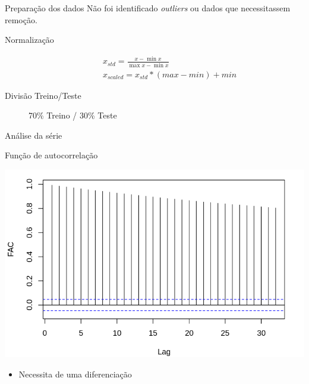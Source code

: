 \documentclass[compress,aspectratio=149,brazil]{beamer}
\begin{document}
\begin{frame}{Preparação dos dados}
    Não foi identificado \textit{outliers} ou dados que necessitassem remoção.

    \begin{description}
        \item[Normalização]
            \[
                \begin{split}\label{eq:minmaxscaler}
                    &x_{std} = \frac{x - \min x}{\max x-\min x}\\
                    &x_{scaled} = x_{std} * (max-min)+min
                \end{split}
            \]
        \item[Divisão Treino/Teste]
            70\% Treino / 30\% Teste
    \end{description}

\end{frame}

\begin{frame}{Análise da série}
    \begin{block}{Função de autocorrelação}
        \begin{center}
            \includegraphics[width=.8\textwidth]{../images/SP500_FAC.png}
        \end{center}
    \end{block}
    \begin{itemize}
        \item Necessita de uma diferenciação
    \end{itemize}
\end{frame}
\end{document}
